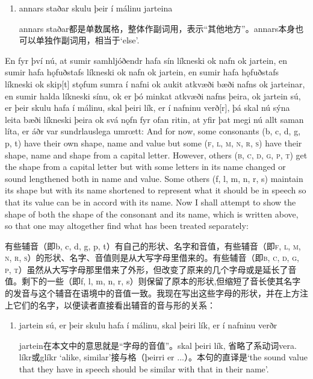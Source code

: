 \begin{grammar*}{}
  \begin{enumerate}[leftmargin=*]
    \item annars staðar skulu þeir í málinu jarteina

          annars staðar都是单数属格，整体作副词用，表示“其他地方”。annars本身也可以单独作副词用，相当于`else'.

  \end{enumerate}
\end{grammar*}
\begin{paracol}{2}
  En fyr því nú, at sumir samhljóðendr hafa sín líkneski ok nafn ok jartein, en sumir hafa hǫfuðstafs líkneski ok nafn ok jartein, en sumir hafa hǫfuðstafs líkneski ok skip[t] stǫfum sumra í nafni ok aukit atkvæði bæði nafns ok jarteinar, en sumir halda líkneski sínu, ok er þó minkat atkvæði nafns þeira, ok jartein sú, er þeir skulu hafa í málinu, skal þeiri lík, er í nafninu verð[r], þá skal nú sýna leita bæði líkneski þeira ok svá nǫfn fyr ofan ritin, at yfir þat megi nú allt saman líta, er áðr var sundrlauslega umrœtt:
  \switchcolumn
  And for now, some consonants (b, c, d, g, p, t) have their own shape, name and value but some (\textsc{f, l, m, n, r, s}) have their shape, name and shape from a capital letter. However, others (\textsc{b, c, d, g, p, t}) get the shape from a capital letter but with some letters in its name changed or sound lengthened both in name and value. Some others (f, l, m, n, r, s) maintain its shape but with its name shortened to represent what it should be in speech so that its value can be in accord with its name. Now I shall attempt to show the shape of both the shape of the consonant and its name, which is written above, so that one may altogether find what has been treated separately:
\end{paracol}
\begin{translation*}{}
  有些辅音（即b, c, d, g, p, t）有自己的形状、名字和音值，有些辅音（即\textsc{f, l, m, n, r, s}）的形状、名字、音值则是从大写字母里借来的。有些辅音（即\textsc{b, c, d, g, p, t}）虽然从大写字母那里借来了外形，但改变了原来的几个字母或是延长了音值。剩下的一些（即f, l, m, n, r, s）则保留了原本的形状,但缩短了音长使其名字的发音与这个辅音在语境中的音值一致。我现在写出这些字母的形状，并在上方注上它们的名字，以便读者直接看出辅音的音与形的关系：
\end{translation*}
\begin{grammar*}{}
  \begin{enumerate}[leftmargin=*]
    \item jartein sú, er þeir skulu hafa í málinu, skal þeiri lík, er í nafninu verðr

          jartein在本文中的意思就是“字母的音值”。skal þeiri lík, 省略了系动词vera. líkr或glíkr `alike, similar'接与格（þeirri er ...）。本句的直译是`the sound value that they have in speech should be similar with that in their name'.

  \end{enumerate}
\end{grammar*}
